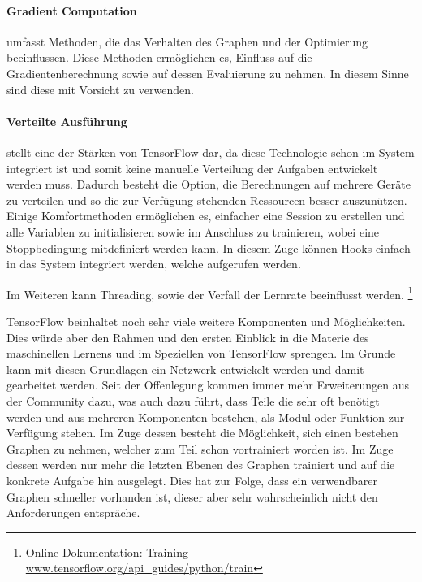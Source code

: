 \paragraph{Gradient Computation} umfasst Methoden, die das Verhalten des Graphen und der Optimierung beeinflussen. 
Diese Methoden ermöglichen es, Einfluss auf die Gradientenberechnung sowie auf dessen Evaluierung zu nehmen. 
In diesem Sinne sind diese mit Vorsicht zu verwenden.

\paragraph{Verteilte Ausführung} stellt eine der Stärken von TensorFlow dar, da diese Technologie schon im System integriert ist und somit keine manuelle Verteilung der Aufgaben entwickelt werden muss. 
Dadurch besteht die Option, die Berechnungen auf mehrere Geräte zu verteilen und so die zur Verfügung stehenden Ressourcen besser auszunützen. \\

\noindent
Einige Komfortmethoden ermöglichen es, einfacher eine Session zu erstellen und alle Variablen zu initialisieren sowie im Anschluss zu trainieren, wobei eine Stoppbedingung mitdefiniert werden kann.
In diesem Zuge können Hooks einfach in das System integriert werden, welche aufgerufen werden.

\noindent
Im Weiteren kann Threading, sowie der Verfall der Lernrate beeinflusst werden. \footnote{Online Dokumentation: Training \url{www.tensorflow.org/api_guides/python/train}}
\phantom \newline



\noindent
TensorFlow beinhaltet noch sehr viele weitere Komponenten und Möglichkeiten. 
Dies würde aber den Rahmen und den ersten Einblick in die Materie des maschinellen Lernens und im Speziellen von TensorFlow sprengen. 
Im Grunde kann mit diesen Grundlagen ein Netzwerk entwickelt werden und damit gearbeitet werden. 
Seit der Offenlegung kommen immer mehr Erweiterungen aus der Community dazu, was auch dazu führt, dass Teile die sehr oft benötigt werden und aus mehreren Komponenten bestehen, als Modul oder Funktion zur Verfügung stehen. 
Im Zuge dessen besteht die Möglichkeit, sich einen bestehen Graphen zu nehmen, welcher zum Teil schon vortrainiert worden ist. 
Im Zuge dessen werden nur mehr die letzten Ebenen des Graphen trainiert und auf die konkrete Aufgabe hin ausgelegt. 
Dies hat zur Folge, dass ein verwendbarer Graphen schneller vorhanden ist, dieser aber sehr wahrscheinlich nicht den Anforderungen entspräche. 

